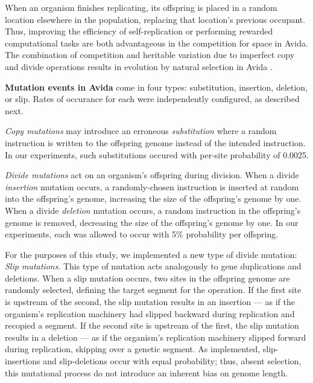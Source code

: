 When an organism finishes replicating, its offspring is placed in a random location elsewhere in the population, replacing that location's previous occupant.
Thus, improving the efficiency of self-replication or performing rewarded computational tasks are both advantageous in the competition for space in Avida. The combination of competition and heritable variation due to imperfect copy and divide operations results in evolution by natural selection in Avida \citep{pennock2007models}.



\medskip
\noindent
\textbf{Mutation events in Avida} come in four types: substitution, insertion, deletion, or slip.
Rates of occurance for each were independently configured, as described next.

\textit{Copy mutations} may introduce an erroneous \textit{substitution} where a random instruction is written to the offspring genome instead of the intended instruction.
In our experiments, such substitutions occured with per-site probability of 0.0025.

\textit{Divide mutations} act on an organism's offspring during division.
When a divide \textit{insertion} mutation occurs, a randomly-chosen instruction is inserted at random into the offspring's genome, increasing the size of the offspring's genome by one.
When a divide \textit{deletion} mutation occurs, a random instruction in the offspring's genome is removed, decreasing the size of the offspring's genome by one.
In our experiments, each was allowed to occur with 5\% probability per offspring.

For the purposes of this study, we implemented a new type of divide mutation: \textit{Slip mutations}.
This type of mutation acts analogously to gene duplications and deletions.
When a slip mutation occurs, two sites in the offspring genome are randomly selected, defining the target segment for the operation.
If the first site is upstream of the second, the slip mutation results in an insertion --- as if the organism's replication machinery had slipped backward during replication and recopied a segment.
If the second site is upstream of the first, the slip mutation results in a deletion --- as if the organism's replication machinery slipped forward during replication, skipping over a genetic segment.
As implemented, slip-insertions and slip-deletions occur with equal probability; thus, absent selection, this mutational process do not introduce an inherent bias on genome length.


